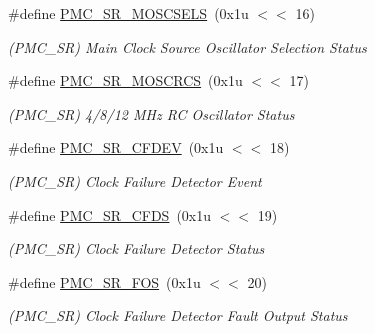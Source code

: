 \begin{DoxyCompactItemize}
\mbox{\label{group__SAME70__PMC_gac975de9eb7b93e8ad0b11e7cd6241c4e}} 
\#define \mbox{\hyperlink{group__SAME70__PMC_gac975de9eb7b93e8ad0b11e7cd6241c4e}{P\+M\+C\+\_\+\+S\+R\+\_\+\+M\+O\+S\+C\+S\+E\+LS}}~(0x1u $<$$<$ 16)
\begin{DoxyCompactList}\small\item\em (P\+M\+C\+\_\+\+SR) Main Clock Source Oscillator Selection Status \end{DoxyCompactList}\item 
\mbox{\label{group__SAME70__PMC_gae3934311ed8c252aa3a4e4efe277988a}} 
\#define \mbox{\hyperlink{group__SAME70__PMC_gae3934311ed8c252aa3a4e4efe277988a}{P\+M\+C\+\_\+\+S\+R\+\_\+\+M\+O\+S\+C\+R\+CS}}~(0x1u $<$$<$ 17)
\begin{DoxyCompactList}\small\item\em (P\+M\+C\+\_\+\+SR) 4/8/12 M\+Hz RC Oscillator Status \end{DoxyCompactList}\item 
\mbox{\label{group__SAME70__PMC_ga3adcbc5d4ac14b059a8fa1bdc190b0b0}} 
\#define \mbox{\hyperlink{group__SAME70__PMC_ga3adcbc5d4ac14b059a8fa1bdc190b0b0}{P\+M\+C\+\_\+\+S\+R\+\_\+\+C\+F\+D\+EV}}~(0x1u $<$$<$ 18)
\begin{DoxyCompactList}\small\item\em (P\+M\+C\+\_\+\+SR) Clock Failure Detector Event \end{DoxyCompactList}\item 
\mbox{\label{group__SAME70__PMC_ga76baf0ac10e0387d96168f44b4580dff}} 
\#define \mbox{\hyperlink{group__SAME70__PMC_ga76baf0ac10e0387d96168f44b4580dff}{P\+M\+C\+\_\+\+S\+R\+\_\+\+C\+F\+DS}}~(0x1u $<$$<$ 19)
\begin{DoxyCompactList}\small\item\em (P\+M\+C\+\_\+\+SR) Clock Failure Detector Status \end{DoxyCompactList}\item 
\mbox{\label{group__SAME70__PMC_ga643598dc51cd165a73738e4de195df0e}} 
\#define \mbox{\hyperlink{group__SAME70__PMC_ga643598dc51cd165a73738e4de195df0e}{P\+M\+C\+\_\+\+S\+R\+\_\+\+F\+OS}}~(0x1u $<$$<$ 20)
\begin{DoxyCompactList}\small\item\em (P\+M\+C\+\_\+\+SR) Clock Failure Detector Fault Output Status \end{DoxyCompactList}\item 
$$
\end{DoxyCompactItemize}
